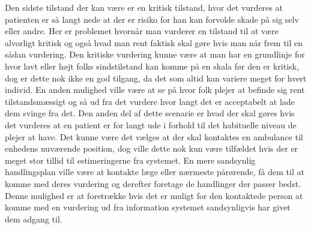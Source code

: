 Den sidste tilstand der kan være er en kritisk tilstand, hvor det vurderes at patienten er så langt nede at der er risiko for han kan forvolde skade på sig selv eller andre.
Her er problemet hvornår man vurderer en tilstand til at være alvorligt kritisk og også hvad man rent faktisk skal gøre hvis man når frem til en sådan vurdering.
Den kritiske vurdering kunne være at man har en grundlinje for hvor lavt eller højt folks sindstilstand kan komme på en skala før den er kritisk, dog er dette nok ikke en god tilgang, da det som altid kan variere meget for hvert individ.
En anden mulighed ville være at se på hvor folk plejer at befinde sig rent tilstandsmæssigt og så ud fra det vurdere hvor langt det er acceptabelt at lade dem svinge fra det.
Den anden del af dette scenarie er hvad der skal gøres hvis det vurderes at en patient er for langt ude i forhold til det habituelle niveau de plejer at have.
Det kunne være det vælges at der skal kontaktes en ambulance til enhedens nuværende position, dog ville dette nok kun være tilfældet hvis der er meget stor tillid til estimeringerne fra systemet.
En mere sandsynlig handlingsplan ville være at kontakte læge eller nærmeste pårørende, få dem til at komme med deres vurdering og derefter foretage de handlinger der passer bedst.
Denne mulighed er at foretrække hvis det er muligt for den kontaktede person at komme med en vurdering ud fra information systemet sandsynligvis har givet dem adgang til.